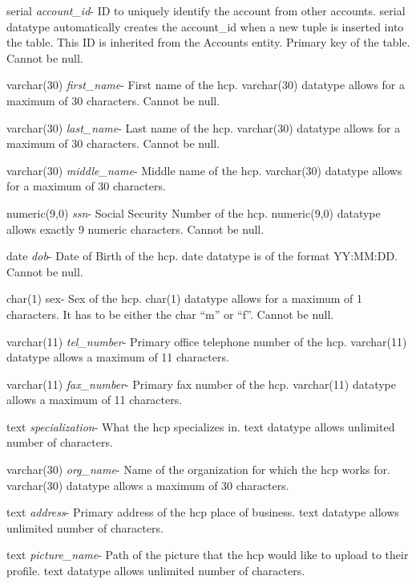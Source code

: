 \begin{description}
\item serial \textit{account\_id}- ID to uniquely identify the account from other accounts. serial datatype automatically creates the account\_id when a new tuple is inserted into the table.  This ID is inherited from the Accounts entity. Primary key of the table.  Cannot be null.
\item varchar(30) \textit{first\_name}-  First name of the hcp.  varchar(30) datatype allows for a maximum of 30 characters.  Cannot be null.
\item varchar(30) \textit{last\_name}- Last name of the hcp.  varchar(30) datatype allows for a maximum of 30 characters.  Cannot be null.
\item varchar(30) \textit{middle\_name}- Middle name of the hcp. varchar(30) datatype allows for a maximum of 30 characters.
\item numeric(9,0) \textit{ssn}- Social Security Number of the hcp. numeric(9,0) datatype allows exactly 9 numeric characters.  Cannot be null.
\item date \textit{dob}- Date of Birth of the hcp.  date datatype is of the format YY:MM:DD.  Cannot be null.
\item char(1) sex- Sex of the hcp. char(1) datatype allows for a maximum of 1 characters.  It has to be either the char ``m'' or ``f''.  Cannot be null.
\item varchar(11) \textit{tel\_number}- Primary office telephone number of the hcp.  varchar(11) datatype allows a maximum of 11 characters.
\item varchar(11) \textit{fax\_number}- Primary fax number of the hcp.  varchar(11) datatype allows a maximum of 11 characters.
\item text \textit{specialization}- What the hcp specializes in.  text datatype allows unlimited number of characters.
\item varchar(30) \textit{org\_name}- Name of the organization for which the hcp works for.  varchar(30) datatype allows a maximum of 30 characters.
\item text \textit{address}- Primary address of the hcp place of business.  text datatype allows unlimited number of characters.
\item text \textit{picture\_name}- Path of the picture that the hcp would like to upload to their profile.  text datatype allows unlimited number of characters.
\end{description}

